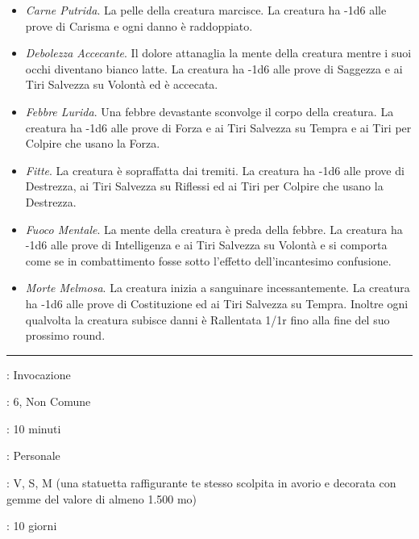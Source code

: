 \begin{multicols}{2}
\begin{itemize}[leftmargin=*] \setlength{\itemsep}{0pt}
	\item \emph{Carne Putrida}. La pelle della creatura marcisce. La creatura ha -1d6 alle prove di Carisma e ogni danno è raddoppiato.
	\item \emph{Debolezza Accecante}. Il dolore attanaglia la mente della creatura mentre i suoi occhi diventano bianco latte. La creatura ha -1d6 alle prove di Saggezza e ai Tiri Salvezza su Volontà ed è accecata.
	\item \emph{Febbre Lurida}. Una febbre devastante sconvolge il corpo della creatura. La creatura ha -1d6 alle prove di Forza e ai Tiri Salvezza su Tempra e ai Tiri per Colpire che usano la Forza.
	\item \emph{Fitte}. La creatura è sopraffatta dai tremiti. La creatura ha -1d6 alle prove di Destrezza, ai Tiri Salvezza su Riflessi ed ai Tiri per Colpire che usano la Destrezza.
	\item \emph{Fuoco Mentale}. La mente della creatura è preda della febbre. La creatura ha -1d6 alle prove di Intelligenza e ai Tiri Salvezza su Volontà e si comporta come se in combattimento fosse sotto l'effetto dell'incantesimo confusione.
	\item \emph{Morte Melmosa}. La creatura inizia a sanguinare incessantemente. La creatura ha -1d6 alle prove di Costituzione ed ai Tiri Salvezza su Tempra. Inoltre ogni qualvolta la creatura subisce danni è Rallentata 1/1r fino alla fine del suo prossimo round.
\end{itemize}

\smallskip\noindent\rule{\linewidth}{2pt} \hypertarget{Contingenza}{}\medskip{}
\noindent
\begin{description}[noitemsep, topsep=0pt, parsep=0pt, partopsep=0pt, leftmargin=0cm, labelwidth=2.8cm]
	\item[\textbf{Lista di Magia}]: Invocazione
	\item[\textbf{Livello}]: 6, Non Comune
	\item[\textbf{T. di Lancio}]: 10 minuti
	\item[\textbf{Gittata}]: Personale
	\item[\textbf{Componenti}]: V, S, M (una statuetta raffigurante te stesso scolpita in avorio e decorata con gemme del valore di almeno 1.500 mo)
	\item[\textbf{Durata}]: 10 giorni
\end{description}


\end{multicols}
